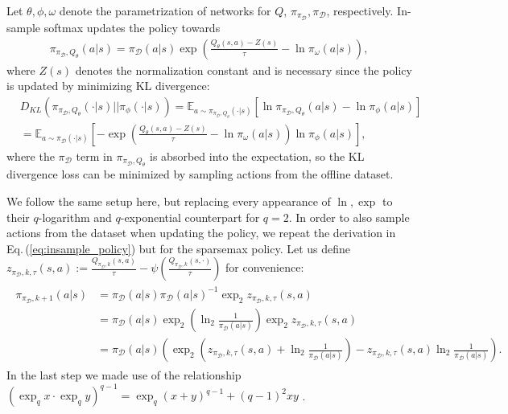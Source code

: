 \documentclass{article}
\newcommand{\AdaBracket}[1]{\left(#1\right)}
\newcommand{\AdaRectBracket}[1]{\left[#1\right]}
\newcommand{\expectation}[2]{\mathbb{E}_{#1}\AdaRectBracket{#2}}
\newcommand{\qlog}{$q$-logarithm }
\newcommand{\KLany}[2]{D_{\!K\!L}\!\left(#1 \left|  \right| #2 \right)}
\newcommand{\expq}[1]{\exp_{q}\!#1}
\newcommand{\eq}[1]{Eq.\,(#1)}
\newcommand{\datasetPolicy}{\pi_{\mathcal{D}}}
\begin{document}
Let $\theta, \phi, \omega$ denote the parametrization of networks for $Q$, $\pi_{\datasetPolicy}, \datasetPolicy$, respectively.
In-sample softmax updates the policy towards 
\begin{align}
    \pi_{\datasetPolicy, Q_{\theta}}(a|s) = \datasetPolicy(a|s)\exp\AdaBracket{\frac{Q_{\theta}(s,a) - Z(s)}{\tau} - \ln \pi_{\omega}(a|s)},
    \label{eq:insample_policy}
\end{align}
where $Z(s)$ denotes the normalization constant and is necessary since the policy is updated by minimizing KL divergence:
\begin{align*}
    &\KLany{\pi_{\datasetPolicy, Q_{\theta}}(\cdot|s)}{\pi_{\phi}(\cdot | s)} = \expectation{a \sim \pi_{\datasetPolicy, Q_{\theta}}(\cdot|s) }{\ln \pi_{\datasetPolicy, Q_{\theta}}(a|s) - \ln \pi_{\phi}(a | s)} \\
    &= \expectation{a \sim \datasetPolicy(\cdot|s)}{ - \exp\AdaBracket{\frac{Q_{\theta}(s,a) - Z(s)}{\tau} - \ln \pi_{\omega}(a|s)} \ln\pi_{\phi}(a|s) },
\end{align*} 
where the $\datasetPolicy$ term in $ \pi_{\datasetPolicy, Q_{\theta}}$ is absorbed into the expectation, so the KL divergence loss can be minimized by sampling actions from the offline dataset.

We follow the same setup here, but replacing every appearance of $\ln, \exp$ to their \qlog and $q$-exponential counterpart for $q=2$.
In order to also sample actions from the dataset when updating the policy, we repeat the derivation in \eq{\ref{eq:insample_policy}} but for the sparsemax policy.
Let us define $z_{\datasetPolicy, k, \tau}(s,a) := \frac{Q_{\datasetPolicy, k}(s,a)}{\tau} - \psi\AdaBracket{\frac{Q_{\datasetPolicy, k}(s,\cdot)}{\tau}}$ for convenience:
\begin{align}
    \begin{split}
        \pi_{\datasetPolicy, k+1} (a|s) &= \datasetPolicy(a|s) \datasetPolicy(a|s)^{-1} \exp_2{z_{\datasetPolicy, k, \tau}(s,a)} \\
        &= \datasetPolicy(a|s)  \exp_2{\AdaBracket{\ln_2{\frac{1}{\datasetPolicy(a|s)}}}} \exp_2{z_{\datasetPolicy, k, \tau}(s,a)}\\
        &=  \datasetPolicy(a|s) \AdaBracket{ \exp_2\AdaBracket{z_{\datasetPolicy, k, \tau}(s,a) + \ln_2\frac{1}{\datasetPolicy(a|s)}} -  z_{\datasetPolicy, k, \tau}(s,a)  \ln_2{\frac{1}{\datasetPolicy(a|s)}} }.
        \label{eq:tsallis_inac_policy}
    \end{split}
\end{align}
In the last step we made use of the relationship $\AdaBracket{\expq{x}\cdot \expq{y}}^{q-1} = \expq{\AdaBracket{x+y}}^{q-1} + (q-1)^2 xy$ \cite{Yamano2004-properties-qlogexp}.
\end{document}

